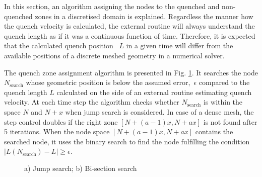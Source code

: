 
In this section, an algorithm assigning the nodes to the quenched and non-quenched zones in a discretised domain is explained. Regardless the manner how the quench velocity is calculated, the external routine will always understand the quench length as if it was a continuous function of time. Therefore, it is expected that the calculated quench position ~$L$ in a given time will differ from the available positions of a discrete meshed geometry in a numerical solver. 

The quench zone assignment algorithm is presented in Fig. \ref{fig:node_search_algo}. It searches the node $N_\text{search}$ whose geometric position is below the assumed error,~$\epsilon$ compared to the quench length $L$ calculated on the side of an external routine estimating quench velocity. At each time step the algorithm checks whether $N_\text{search}$ is within the space $N$ and ${N+x}$ when jump search is considered. In case of a dense mesh, the step control doubles if the right zone ${[N+(a-1)x, N+ax]}$ is not found after 5 iterations. When the node space ${[N+(a-1)x, N+ax]}$ contains the searched node, it uses the binary search to find the node fulfilling the condition ${\mid L(N_\text{search}) - L \mid \geq \epsilon}$. 

\begin{figure}[H]
\centering
{}
\caption{ a) Jump search; b) Bi-section search}
\label{fig:node_search_algo}
\end{figure}


